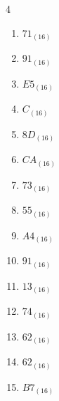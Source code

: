 \begin{multicols}{4}
\begin{enumerate}
        \phantom{$=155$}

\columnbreak %

  \item $71_{(16)}$

        \phantom{$=113$}

  \item $91_{(16)}$

        \phantom{$=145$}

  \item $E5_{(16)}$

        \phantom{$=229$}

  \item $C_{(16)}$

        \phantom{$=12$}

  \item $8D_{(16)}$

        \phantom{$=141$}

  \item $CA_{(16)}$

        \phantom{$=202$}

  \item $73_{(16)}$

        \phantom{$=115$}

  \item $55_{(16)}$

        \phantom{$=85$}

  \item $A4_{(16)}$

        \phantom{$=164$}

  \item $91_{(16)}$

        \phantom{$=145$}

  \item $13_{(16)}$

        \phantom{$=19$}

  \item $74_{(16)}$

        \phantom{$=116$}

  \item $62_{(16)}$

        \phantom{$=98$}

  \item $62_{(16)}$

        \phantom{$=98$}

  \item $B7_{(16)}$

        \phantom{$=183$}


\end{enumerate}
\end{multicols}
